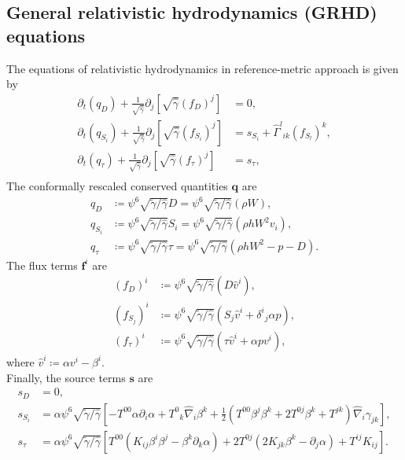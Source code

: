 \subsection{General relativistic hydrodynamics (GRHD) equations}
\label{section2.2.1}
The equations of relativistic hydrodynamics in reference-metric approach is given by
\begin{align}
    \partial_t \left( q_{D} \right) + \frac{1}{\sqrt{\hat{\gamma}}} \partial_j \left[ \sqrt{\hat{\gamma}} \left( f_{D} \right)^j \right]
    &= 0, \\
    \partial_t \left( q_{S_i} \right) + \frac{1}{\sqrt{\hat{\gamma}}} \partial_j \left[ \sqrt{\hat{\gamma}} \left( f_{S_i} \right)^j \right]
    &= s_{S_i} + \hat{\Gamma}^l{}_{ik}\left( f_{S_l} \right)^k, \\
    \partial_t \left( q_{\tau} \right) + \frac{1}{\sqrt{\hat{\gamma}}} \partial_j \left[ \sqrt{\hat{\gamma}} \left( f_{\tau} \right)^j \right]
    &= s_{\tau}, \\
\end{align}
The conformally rescaled conserved quantities $\mathbf{q}$ are
\begin{align}
    q_D & \coloneqq \psi^6 \sqrt{\tilde{\gamma}/\hat{\gamma}} D = \psi^6 \sqrt{\tilde{\gamma}/\hat{\gamma}} \left( \rho W \right), \\
    q_{S_i} & \coloneqq \psi^6 \sqrt{\tilde{\gamma}/\hat{\gamma}} S_i = \psi^6 \sqrt{\tilde{\gamma}/\hat{\gamma}} \left( \rho h W^2 v_i \right), \\
    q_\tau & \coloneqq \psi^6 \sqrt{\tilde{\gamma}/\hat{\gamma}} \tau = \psi^6 \sqrt{\tilde{\gamma}/\hat{\gamma}} \left( \rho h W^2 - p - D \right).
\end{align}
The flux terms $\mathbf{f}^i$ are
\begin{align}
    \left(f_D \right)^i & \coloneqq \psi^6 \sqrt{\tilde{\gamma}/\hat{\gamma}} \left( D \hat{v}^i \right), \\
    \left(f_{S_j} \right)^i & \coloneqq \psi^6 \sqrt{\tilde{\gamma}/\hat{\gamma}} \left(S_j \hat{v}^i + \delta^i{}_j \alpha p \right), \\
    \left(f_\tau \right)^i & \coloneqq \psi^6 \sqrt{\tilde{\gamma}/\hat{\gamma}} \left(\tau \hat{v}^i + \alpha p v^i \right),
\end{align}
where $\hat{v}^i \coloneqq \alpha v^i -\beta^i$.\\
Finally, the source terms $\mathbf{s}$ are
\begin{align}
    s_D &= 0, \\
    s_{S_i} &= \alpha \psi^6 \sqrt{\tilde{\gamma}/\hat{\gamma}} 
    \left[ - T^{00} \alpha\partial_i \alpha + T^0{}_k \hat{\nabla}_i \beta^k
    + \frac{1}{2} \left( T^{00} \beta^j \beta^k + 2 T^{0j} \beta^k + T^{jk} \right) \hat{\nabla}_i \gamma_{jk} \right], \\
    s_\tau &= \alpha \psi^6 \sqrt{\tilde{\gamma}/\hat{\gamma}}
    \left[ T^{00} \left(K_{ij}\beta^i \beta^j - \beta^k \partial_k \alpha \right)
    + 2 T^{0j} \left( 2 K_{jk} \beta^k - \partial_j \alpha \right) 
    + T^{ij} K_{ij} \right].
\end{align}
